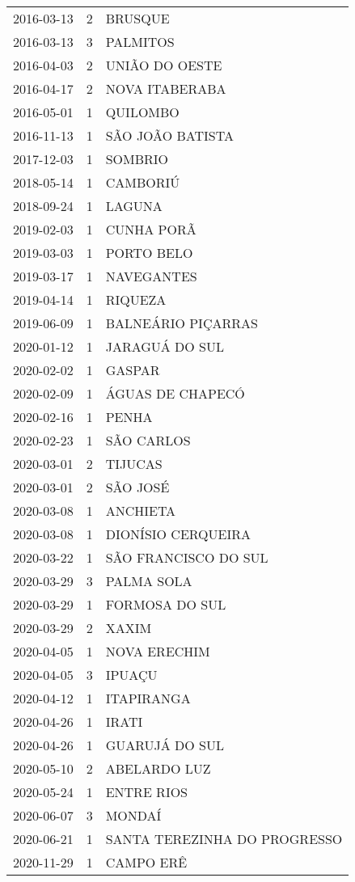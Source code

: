\begin{longtable}[htbp]{ccl}
2016-03-13 & 2 & BRUSQUE \\
2016-03-13 & 3 & PALMITOS \\
2016-04-03 & 2 & UNIÃO DO OESTE \\
2016-04-17 & 2 & NOVA ITABERABA \\
2016-05-01 & 1 & QUILOMBO \\
2016-11-13 & 1 & SÃO JOÃO BATISTA \\
2017-12-03 & 1 & SOMBRIO \\
2018-05-14 & 1 & CAMBORIÚ \\
2018-09-24 & 1 & LAGUNA \\
2019-02-03 & 1 & CUNHA PORÃ \\
2019-03-03 & 1 & PORTO BELO \\
2019-03-17 & 1 & NAVEGANTES \\
2019-04-14 & 1 & RIQUEZA \\
2019-06-09 & 1 & BALNEÁRIO PIÇARRAS \\
2020-01-12 & 1 & JARAGUÁ DO SUL \\
2020-02-02 & 1 & GASPAR \\
2020-02-09 & 1 & ÁGUAS DE CHAPECÓ \\
2020-02-16 & 1 & PENHA \\
2020-02-23 & 1 & SÃO CARLOS \\
2020-03-01 & 2 & TIJUCAS \\
2020-03-01 & 2 & SÃO JOSÉ \\
2020-03-08 & 1 & ANCHIETA \\
2020-03-08 & 1 & DIONÍSIO CERQUEIRA \\
2020-03-22 & 1 & SÃO FRANCISCO DO SUL \\
2020-03-29 & 3 & PALMA SOLA \\
2020-03-29 & 1 & FORMOSA DO SUL \\
2020-03-29 & 2 & XAXIM \\
2020-04-05 & 1 & NOVA ERECHIM \\
2020-04-05 & 3 & IPUAÇU \\
2020-04-12 & 1 & ITAPIRANGA \\
2020-04-26 & 1 & IRATI \\
2020-04-26 & 1 & GUARUJÁ DO SUL \\
2020-05-10 & 2 & ABELARDO LUZ \\
2020-05-24 & 1 & ENTRE RIOS \\
2020-06-07 & 3 & MONDAÍ \\
2020-06-21 & 1 & SANTA TEREZINHA DO PROGRESSO \\
2020-11-29 & 1 & CAMPO ERÊ \\

\end{longtable}
